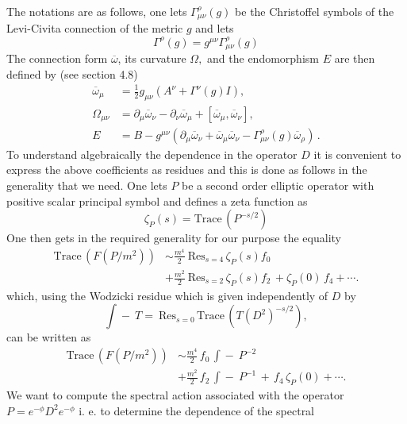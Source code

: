 \documentclass[12pt]{article}%
\begin{document}
The notations are as follows, one lets $\Gamma_{\mu\nu}^{\rho}\left(
g\right)  $ be the Christoffel symbols of the Levi-Civita connection of the
metric $g$ and lets
\[
\Gamma^{\rho}\left(  g\right)  =g^{\mu\nu}\Gamma_{\mu\nu}^{\rho}\left(
g\right)
\]
The connection form $\overline{\omega}$, its curvature $\Omega,$ and the
endomorphism $E$ are then defined by (see \cite{Gilkey} section 4.8)
\begin{align}
\overline{\omega}_{\mu}  &  =\frac{1}{2}g_{\mu\nu}\left(  A^{\nu}+\Gamma^{\nu
}\left(  g\right)  I\right)  ,\label{notations}\\
\Omega_{\mu\nu}  &  =\partial_{\mu}\overline{\omega}_{\nu}-\partial_{\nu
}\overline{\omega}_{\mu}+\left[  \overline{\omega}_{\mu},\overline{\omega
}_{\nu}\right]  ,\\
E  &  =B-g^{\mu\nu}\left(  \partial_{\mu}\overline{\omega}_{\nu}%
+\overline{\omega}_{\mu}\overline{\omega}_{\nu}-\Gamma_{\mu\nu}^{\rho}\left(
g\right)  \overline{\omega}_{\rho}\right)  \,.
\end{align}
To understand algebraically the dependence in the operator $D$ it is
convenient to express the above coefficients as residues and this is done as
follows in the generality that we need. One lets $P$ be a second order
elliptic operator with positive scalar principal symbol and defines a zeta
function as
\[
\zeta_{P}(s)=\mathrm{Trace}\,(P^{-s/2})\label{eq1.70}%
\]
One then gets in the required generality for our purpose the equality
\begin{align}
\mathrm{Trace}\,(F(P/m^{2}))  &  \sim\frac{m^{4}}{2}\ \mathrm{Res}%
_{s=4}\,\zeta_{P}(s)f_{0}\,\nonumber\\
&  +\frac{m^{2}}{2}\ \mathrm{Res}_{s=2}\,\zeta_{P}(s)f_{2}\,+\zeta
_{P}(0)\,f_{4}+\cdots.\nonumber
\end{align}
which, using the Wodzicki residue which is given independently of $D$ by
\begin{equation}
\int\!\!\!\!\!\!-\ T=\ \mathrm{Res}_{s=0}^{{}}\,\mathrm{Trace}\,(T(D^{2}%
)^{-s/2}), \label{res}%
\end{equation}
can be written as
\begin{align}
\mathrm{Trace}\,(F(P/m^{2}))  &  \sim\frac{m^{4}}{2}\,f_{0}\,\int
\!\!\!\!\!\!-\ P^{-2}\label{resform}\\
&  +\frac{m^{2}}{2}\,f_{2}\,\int\!\!\!\!\!\!-\ P^{-1}\,+\,f_{4}\,\zeta
_{P}(0)+\cdots.\nonumber
\end{align}
We want to compute the spectral action associated with the operator
$P=e^{-\phi}D^{2}e^{-\phi}$ i. e. to determine the dependence of the spectral
\end{document}
